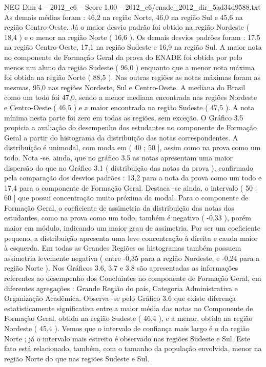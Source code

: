 \begin{textsample}{NEG Dim 4 – 2012\_c6 – Score 1.00 – 2012\_c6/enade\_2012\_dir\_5ad34d9588.txt}
As demais médias foram : 46,2 na região Norte, 46,0 na região Sul e 45,6 na região Centro-Oeste.
Já o maior desvio padrão foi obtido na região Nordeste ( 18,4 ) e o menor na região Norte ( 16,6 ).
Os demais desvios padrões foram : 17,5 na região Centro-Oeste, 17,1 na região Sudeste e 16,9 na região Sul.
A maior nota no componente de Formação Geral da prova do ENADE foi obtida por pelo menos um aluno da região Sudeste ( 96,0 ) enquanto que a menor nota máxima foi obtida na região Norte ( 88,5 ).
Nas outras regiões as notas máximas foram as mesmas, 95,0 nas regiões Nordeste, Sul e Centro-Oeste.
A mediana do Brasil como um todo foi 47,0, sendo a menor mediana encontrada nas regiões Nordeste e Centro-Oeste ( 46,5 ) e a maior encontrada na região Sudeste ( 47,5 ).
A nota mínima nesta parte foi zero em todas as regiões, sem exceção.
O Gráfico 3.5 propicia a avaliação do desempenho dos estudantes no componente de Formação Geral a partir do histograma da distribuição das notas correspondentes.
A distribuição é unimodal, com moda em ( 40 ; 50 ], assim como na prova como um todo.
Nota -se, ainda, que no gráfico 3.5 as notas apresentam uma maior dispersão do que no Gráfico 3.1 ( distribuição das notas da prova ), confirmado pela comparação dos desvios padrões : 13,2 para a nota da prova como um todo e 17,4 para o componente de Formação Geral.
Destaca -se ainda, o intervalo ( 50 ; 60 ] que possui concentração muito próxima da modal.
Para o componente de Formação Geral, o coeficiente de assimetria da distribuição das notas dos estudantes, como na prova como um todo, também é negativo ( -0,33 ), porém maior em módulo, indicando um maior grau de assimetria.
Por ser um coeficiente pequeno, a distribuição apresenta uma leve concentração à direita e cauda maior à esquerda.
Em todas as Grandes Regiões os histogramas também possuem assimetria levemente negativa ( entre -0,35 para a região Nordeste, e -0,24 para a região Norte ).
Nos Gráficos 3.6, 3.7 e 3.8 são apresentadas as informações referentes ao desempenho dos Concluintes no componente de Formação Geral, em diferentes agregações : Grande Região do país, Categoria Administrativa e Organização Acadêmica.
Observa -se pelo Gráfico 3.6 que existe diferença estatisticamente significativa entre a maior média das notas no Componente de Formação Geral, obtida na região Sudeste ( 46,4 ), e a menor, obtida na região Nordeste ( 45,4 ).
Vemos que o intervalo de confiança mais largo é o da região Norte ; já o intervalo mais estreito é observado nas regiões Sudeste e Sul.
Este fato está relacionado, também, com o tamanho da população envolvida, menor na região Norte do que nas regiões Sudeste e Sul.

\end{textsample}
